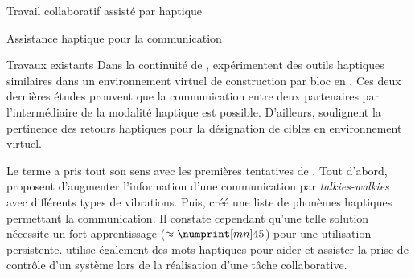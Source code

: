 \documentclass[myfrancais,ngerman,english,french]{mythesis}
\begin{document}
\begin{mychapter}{Travail collaboratif assisté par haptique}
\begin{mysection}{Assistance haptique pour la communication}
\begin{mysubsection}{Travaux existants}
				Dans la continuité de ,  expérimentent des outils haptiques similaires dans un environnement virtuel de construction par bloc en \myThreeD.
				Ces deux dernières études prouvent que la communication entre deux partenaires par l'intermédiaire de la modalité haptique est possible.
				D'ailleurs,  soulignent la pertinence des retours haptiques pour la désignation de cibles en environnement virtuel.

				Le terme  a pris tout son sens avec les premières tentatives de .
				Tout d'abord,  proposent d'augmenter l'information d'une communication par \textit{talkies-walkies} avec différents types de vibrations.
				Puis,  créé une liste de phonèmes haptiques permettant la communication.
				Il constate cependant qu'une telle solution nécessite un fort apprentissage ($\approx \mynum[mn]{45}$) pour une utilisation persistente.
				 utilise également des mots haptiques pour aider et assister la prise de contrôle d'un système lors de la réalisation d'une tâche collaborative.


\end{mysubsection}
\end{mysection}
\end{mychapter}
\end{document}

